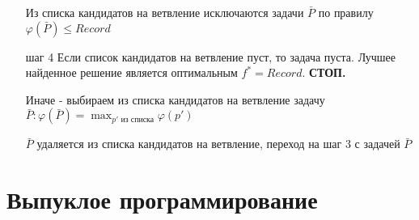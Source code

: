 \documentclass[a4paper]{article}
\theoremstyle{definition}
\theoremstyle{remark}
\begin{document}
\begin{enumerate}
    Из списка кандидатов на ветвление исключаются задачи $\bar{P}$ по правилу $\varphi(\bar{P})\le Record$
    \item [шаг 4]
    Если список кандидатов на ветвление пуст, то задача пуста. Лучшее найденное решение является оптимальным $f^* = Record$. \textbf{СТОП.}

    Иначе - выбираем из списка кандидатов на ветвление задачу $\bar {P}: \varphi(\bar{P}) = \max_{p' \text{ из списка}}\varphi(p')$

    $\bar{P}$ удаляется из списка кандидатов на ветвление, переход на шаг 3 с задачей $\bar{P}$
\end{enumerate}
\section{Выпуклое программирование}
\end{document}
